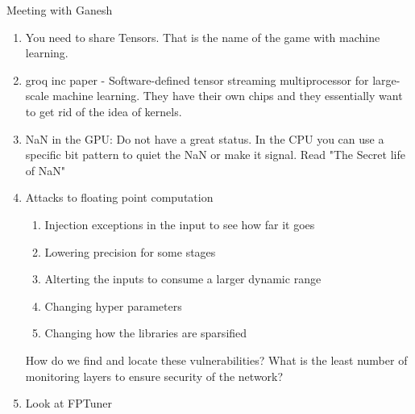 \documentclass[a4paper, 11pt, oneside]{researchjournal} %
\begin{document}
Meeting with Ganesh
\begin{enumerate}
    \item You need to share Tensors. That is the name of the game with machine learning. 
    \item groq inc paper - Software-defined tensor streaming multiprocessor for large-scale machine learning. They have their own chips and they essentially want to get rid of the idea of kernels.
    \item NaN in the GPU: Do not have a great status. In the CPU you can use a specific bit pattern to quiet the NaN or make it signal. Read "The Secret life of NaN"
    \item Attacks to floating point computation
    \begin{enumerate}
        \item Injection exceptions in the input to see how far it goes
        \item Lowering precision for some stages
        \item Alterting the inputs to consume a larger dynamic range 
        \item Changing hyper parameters
        \item Changing how the libraries are sparsified
    \end{enumerate}
    How do we find and locate these vulnerabilities? What is the least number of monitoring layers to ensure security of the network?
    \item Look at FPTuner
\end{enumerate}
\end{document}
